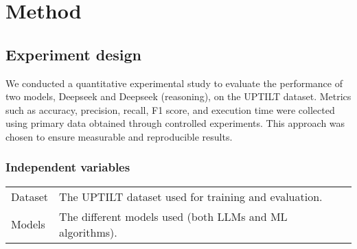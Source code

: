 \section{Method}
%
%
%

\subsection{Experiment design}
%
%
%
%
We conducted a quantitative experimental study to evaluate the performance of two
models, Deepseek and Deepseek (reasoning), on the UPTILT dataset. Metrics such
as accuracy, precision, recall, F1 score, and execution time were collected
using primary data obtained through controlled experiments. This approach was chosen
to ensure measurable and reproducible results.

\subsubsection{Independent variables}
%
%
%
\begin{center}
    \begin{tabular}{| l | l |}
        Dataset & The UPTILT dataset used for training and evaluation.     \\
        Models  & The different models used (both LLMs and ML algorithms). \\
    \end{tabular}
\end{center}

